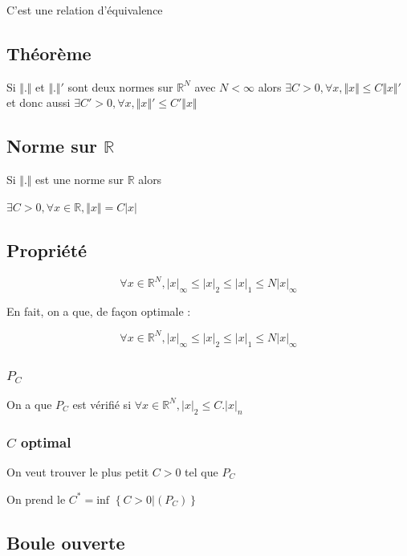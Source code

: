 \documentclass[a4paper,10pt]{article}
\newcommand{\R}{\mathbb{R}}
\newcommand{\tset}[1]{\left\lbrace #1 \right\rbrace}
\newcommand{\abs}[1]{\left\vert #1 \right\vert}
\begin{document}
C'est une relation d'équivalence

\subsection{Théorème}

Si $\Vert.\Vert$ et $\Vert.\Vert'$ sont deux normes sur $\R^N$ avec $N < \infty$ alors $\exists C > 0, \forall x, \Vert x \Vert \leq C \Vert x \Vert'$ et donc aussi $\exists C' > 0, \forall x, \Vert x \Vert' \leq C' \Vert x \Vert$

\subsection{Norme sur $\R$}

Si $\Vert.\Vert$ est une norme sur $\R$ alors 

$\exists C > 0, \forall x \in \R, \Vert x \Vert = C \abs{x}$

\subsection{Propriété}

$$\forall x \in \R^N, \vert x \vert_\infty \leq \vert x \vert_2 \leq \vert x \vert_1 \leq N \vert x \vert_\infty$$

En fait, on a que, de façon optimale :

$$\forall x \in \R^N, \vert x \vert_\infty \leq \vert x \vert_2 \leq \vert x \vert_1 \leq N \vert x \vert_\infty$$

\subsubsection{$P_C$}

On a que $P_C$ est vérifié si $\forall x \in \R^N, \vert x \vert_2 \leq C.\vert x \vert_n$

\subsubsection{$C$ optimal}

On veut trouver le plus petit $C > 0$ tel que $P_C$

On prend le $C^* = \mbox{inf } \tset{C > 0 \vert (P_C)}$



\subsection{Boule ouverte}
\end{document}
